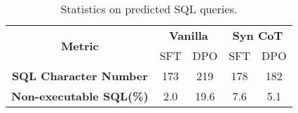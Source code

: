 \begin{table}[htb]
    \centering
\begin{adjustbox}{max width=0.8\columnwidth}
    \begin{tabular}{c | c  c  c  c }
    \toprule
       \multirow{2}{*}{\textbf{Metric}} & \multicolumn{2}{c}{\textbf{Vanilla}} & \multicolumn{2}{c}{\textbf{Syn CoT}} \\
       & SFT & DPO & SFT & DPO \\
    \midrule
        \textbf{SQL Character Number} & 173 & 219 & 178 & 182 \\
       \textbf{Non-executable SQL(\%)} & 2.0 & 19.6 & 7.6 & 5.1 \\
    \bottomrule
    \end{tabular}
\end{adjustbox}
\caption{Statistics on predicted SQL queries.}
\label{tab:RewardHackingStat}
\end{table}